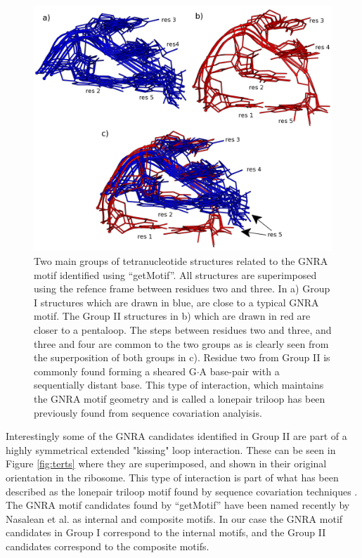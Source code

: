 \begin{figure}
\centering 
\includegraphics[angle=0, scale=2]{Chapter5/groupsB.png}
\caption{Two main groups of  tetranucleotide structures related to the
  GNRA  motif  identified   using  ``getMotif''.  All  structures  are
  superimposed  using  the  refence  frame between  residues  two  and
  three. In a)  Group I structures which are drawn  in blue, are close
  to a  typical GNRA motif.  The  Group II structures in  b) which are
  drawn in red  are closer to a pentaloop.  The steps between residues
  two and three, and three and four are common to the two groups as is
  clearly seen from  the superposition of both groups  in c).  Residue
  two  from Group  II is  commonly found  forming a  sheared G$\cdot$A
  base-pair  with   a  sequentially   distant  base.   This   type  of
  interaction, which maintains the GNRA motif geometry and is called a
  lonepair  triloop  \cite{lee2003}  has  been previously  found  from
  sequence covariation analyisis.}
\label{fig:groupsB}
\end{figure}

Interestingly some of  the GNRA candidates identified in  Group II are
part    of   a    highly   symmetrical    extended    "kissing"   loop
interaction. These  can be seen  in Figure \ref{fig:terts}  where they
are  superimposed, and  shown  in their  original  orientation in  the
ribosome. This type of interaction  is part of what has been described
as the lonepair triloop motif found by sequence covariation techniques
\cite{lee2003}.  The GNRA motif  candidates found by ``getMotif'' have
been named recently by Nasalean et al. \cite{nasalean2009} as internal
and composite motifs.  In our  case the GNRA motif candidates in Group
I correspond to the internal motifs, and the Group II candidates
correspond to the composite motifs.

